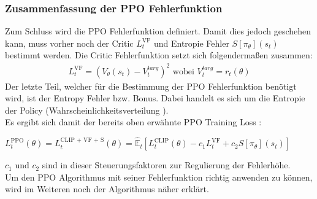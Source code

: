 \subsubsection{Zusammenfassung der PPO Fehlerfunktion} \label{subsubsec:Grundlagen_PPO_Fehlerfunktion} 
Zum Schluss wird die PPO Fehlerfunktion definiert. Damit dies jedoch geschehen kann, muss vorher noch der Critic $L^{\text{VF}}_{t}$ und Entropie Fehler $S[\pi_{\theta}](s_{t})$ bestimmt werden. Die Critic Fehlerfunktion setzt sich folgendermaßen zusammen:
\begin{align}
	L^{\text{VF}}_{t} = (V_{\theta}(s_{t})-V_{t}^{targ})^2 \text{ wobei } V_{t}^{targ} = r_{t}(\theta)
	\label{eq:Grundlagen_Critic_Loss}
\end{align} 
Der letzte Teil, welcher für die Bestimmung der PPO Fehlerfunktion benötigt wird, ist der Entropy Fehler bzw. Bonus. Dabei handelt es sich um die Entropie der Policy (Wahrscheinlichkeitsverteilung ).\\
Es ergibt sich damit der bereits oben erwähnte PPO Training Loss :
\begin{center}
	$L^\text{PPO}_{t} (\theta) = L^\text{CLIP + VF + S}_{t} (\theta) = \mathbb{\hat{E}}_{t} [L^{\text{CLIP}}_{t}(\theta) - c_{1}L^{\text{VF}}_{t} + c_{2}S[\pi_{\theta}](s_{t})]$
\end{center}
$c_1 \text{ und } c_2$ sind in dieser Steuerungsfaktoren zur Regulierung der Fehlerhöhe.\\
Um den PPO Algorithmus mit seiner Fehlerfunktion richtig anwenden zu können, wird im Weiteren noch der Algorithmus näher erklärt.

